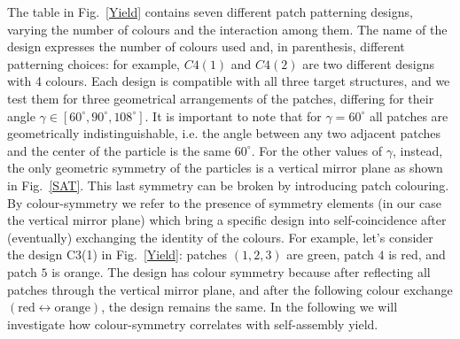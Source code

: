 \documentclass[a4paper, amsfonts, amssymb, amsmath, reprint, showkeys, nofootinbib, oneside]{revtex4-1}
\begin{document}
The table in Fig.~\ref{Yield} contains seven different patch patterning designs, varying the number of colours and the interaction among them. The name of the design expresses the number of colours used and, in parenthesis, different patterning choices: for example, $C4(1)$ and $C4(2)$ are two different designs with 4 colours. Each design is compatible with all three target structures, and we test them for three geometrical arrangements of the patches, differing for their angle $\gamma\in [60^\circ, 90^\circ, 108^\circ]$. It is important to note that for $\gamma=60^\circ$ all patches are geometrically indistinguishable, i.e. the angle between any two adjacent patches and the center of the particle is the same $60^\circ$. For the other values of $\gamma$, instead, the only geometric symmetry of the particles is a vertical mirror plane as shown in Fig.~\ref{SAT}. This last symmetry can be broken by introducing patch colouring. By colour-symmetry we refer to the presence of symmetry elements (in our case the vertical mirror plane) which bring a specific design into self-coincidence after (eventually) exchanging the identity of the colours. For example, let's consider the design C3(1) in Fig.~\ref{Yield}: patches $(1,2,3)$ are green, patch $4$ is red, and patch $5$ is orange. The design has colour symmetry because after reflecting all patches through the vertical mirror plane, and after the following colour exchange $(\text{red}\leftrightarrow\text{orange})$, the design remains the same.
In the following we will investigate how colour-symmetry correlates with self-assembly yield.
\end{document}
